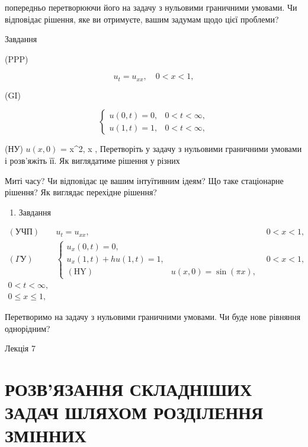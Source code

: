 \documentclass[
  ukrainian,
]{article}
\providecommand{\tightlist}{%
  \setlength{\itemsep}{0pt}\setlength{\parskip}{0pt}}
\begin{document}
попередньо перетворюючи його на задачу з нульовими граничними умовами.
Чи відповідає рішення, яке ви отримуєте, вашим задумам щодо цієї
проблеми?

Завдання

(PPP)

\[
u_t = u_{xx}, \quad 0 < x < 1,
\]

(GI)

\[
\begin{cases} u(0, t) = 0, & 0 < t < \infty, \\ u(1, t) = 1, & 0 < t < \infty, \end{cases}
\]

(НУ) \(u(x, 0)\) = x\^{}2,  \le x , Перетворіть у задачу з
нульовими граничними умовами і розв'яжіть її. Як виглядатиме рішення у
різних

Миті часу? Чи відповідає це вашим інтуїтивним ідеям? Що таке стаціонарне
рішення? Як виглядає перехідне рішення?

\begin{enumerate}
\def\labelenumi{\arabic{enumi}.}
\setcounter{enumi}{2}
\tightlist
\item
  Завдання
\end{enumerate}

\[
\begin{array}{ll} (\text{УЧП}) & u_t = u_{xx}, & 0 < x < 1, \\ (\Gamma \text{У}) & \begin{cases} u_x(0, t) = 0, \\ u_x(1, t) + hu(1, t) = 1, \\ (\text{HY}) & u(x, 0) = \sin(\pi x), \end{cases} & 0 < x < 1, \\ 0 < t < \infty, \\ 0 \le x \le 1, \end{array}
\]

Перетворимо на задачу з нульовими граничними умовами. Чи буде нове
рівняння однорідним?

Лекція 7

\section{РОЗВ'ЯЗАННЯ СКЛАДНІШИХ ЗАДАЧ ШЛЯХОМ РОЗДІЛЕННЯ
ЗМІННИХ}\label{ux440ux43eux437ux432ux44fux437ux430ux43dux43dux44f-ux441ux43aux43bux430ux434ux43dux456ux448ux438ux445-ux437ux430ux434ux430ux447-ux448ux43bux44fux445ux43eux43c-ux440ux43eux437ux434ux456ux43bux435ux43dux43dux44f-ux437ux43cux456ux43dux43dux438ux445}
\end{document}
